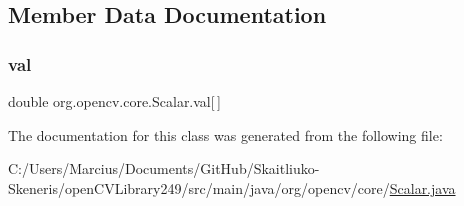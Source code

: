 \subsection{Member Data Documentation}
\mbox{\label{classorg_1_1opencv_1_1core_1_1_scalar_ad5d5ede832d661889ead64c3353f9dd5}} 
\subsubsection{\texorpdfstring{val}{val}}
{\footnotesize\ttfamily double org.\+opencv.\+core.\+Scalar.\+val\mbox{[}$\,$\mbox{]}}



The documentation for this class was generated from the following file\+:\begin{DoxyCompactItemize}
\item 
C\+:/\+Users/\+Marcius/\+Documents/\+Git\+Hub/\+Skaitliuko-\/\+Skeneris/open\+C\+V\+Library249/src/main/java/org/opencv/core/\mbox{\hyperlink{_scalar_8java}{Scalar.\+java}}\end{DoxyCompactItemize}
